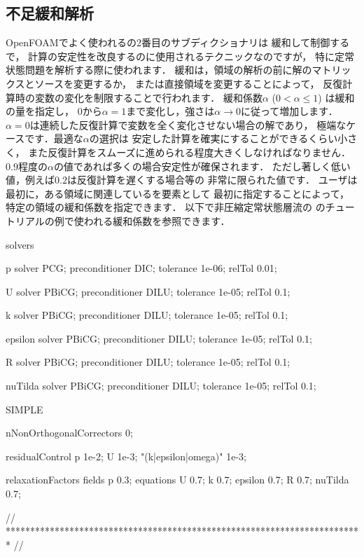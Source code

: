 \subsection{不足緩和解析}
\label{ssec:4.5.2}
OpenFOAMでよく使われるの2番目のサブディクショナリは
緩和して制御するで，
計算の安定性を改良するのに使用されるテクニックなのですが，
特に定常状態問題を解析する際に使われます．
緩和は，領域の解析の前に解のマトリックスとソースを変更するか，
または直接領域を変更することによって，
反復計算時の変数の変化を制限することで行われます．
緩和係数$\alpha$ ($0 < \alpha \le 1$) は緩和の量を指定し，
$0$から$\alpha = 1$まで変化し，強さは$\alpha \to 0$に従って増加します．
$\alpha = 0$は連続した反復計算で変数を全く変化させない場合の解であり，
極端なケースです．最適な$\alpha$の選択は
安定した計算を確実にすることができるくらい小さく，
また反復計算をスムーズに進められる程度大きくしなければなりません．
$0.9$程度の$\alpha$の値であれば多くの場合安定性が確保されます．
ただし著しく低い値，例えば$0.2$は反復計算を遅くする場合等の
非常に限られた値です．
ユーザは最初に，ある領域に関連しているを要素として
最初に指定することによって，特定の領域の緩和係数を指定できます．
以下で非圧縮定常状態層流の
のチュートリアルの例で使われる緩和係数を参照できます．
\begin{OFverbatim}[file, linenum=17]

solvers
{
    p
    {
        solver          PCG;
        preconditioner  DIC;
        tolerance       1e-06;
        relTol          0.01;
    }

    U
    {
        solver          PBiCG;
        preconditioner  DILU;
        tolerance       1e-05;
        relTol          0.1;
    }

    k
    {
        solver          PBiCG;
        preconditioner  DILU;
        tolerance       1e-05;
        relTol          0.1;
    }

    epsilon
    {
        solver          PBiCG;
        preconditioner  DILU;
        tolerance       1e-05;
        relTol          0.1;
    }

    R
    {
        solver          PBiCG;
        preconditioner  DILU;
        tolerance       1e-05;
        relTol          0.1;
    }

    nuTilda
    {
        solver          PBiCG;
        preconditioner  DILU;
        tolerance       1e-05;
        relTol          0.1;
    }
}

SIMPLE
{
    nNonOrthogonalCorrectors 0;

    residualControl
    {
        p               1e-2;
        U               1e-3;
        "(k|epsilon|omega)" 1e-3;
    }
}

relaxationFactors
{
    fields
    {
        p               0.3;
    }
    equations
    {
        U               0.7;
        k               0.7;
        epsilon         0.7;
        R               0.7;
        nuTilda         0.7;
    }
}


// ************************************************************************* //
\end{OFverbatim}


